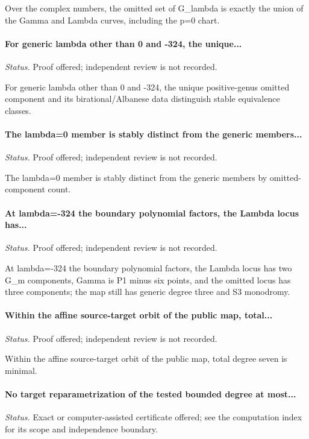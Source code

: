 Over the complex numbers, the omitted set of G\_lambda is exactly the union of the Gamma and Lambda curves, including the p=0 chart.

\label{supp-note-04-004}
\paragraph{For generic lambda other than 0 and -324, the unique...}
\emph{Status.} Proof offered; independent review is not recorded.

For generic lambda other than 0 and -324, the unique positive-genus omitted component and its birational/Albanese data distinguish stable equivalence classes.

\label{supp-note-04-005}
\paragraph{The lambda=0 member is stably distinct from the generic members...}
\emph{Status.} Proof offered; independent review is not recorded.

The lambda=0 member is stably distinct from the generic members by omitted-component count.

\label{supp-note-04-006}
\paragraph{At lambda=-324 the boundary polynomial factors, the Lambda locus has...}
\emph{Status.} Proof offered; independent review is not recorded.

At lambda=-324 the boundary polynomial factors, the Lambda locus has two G\_m components, Gamma is P1 minus six points, and the omitted locus has three components; the map still has generic degree three and S3 monodromy.

\label{supp-note-04-007}
\paragraph{Within the affine source-target orbit of the public map, total...}
\emph{Status.} Proof offered; independent review is not recorded.

Within the affine source-target orbit of the public map, total degree seven is minimal.

\label{supp-note-04-008}
\paragraph{No target reparametrization of the tested bounded degree at most...}
\emph{Status.} Exact or computer-assisted certificate offered; see the computation index for its scope and independence boundary.

